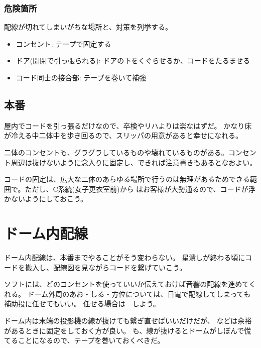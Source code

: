 \documentclass[letterpaper,10pt,dvipdfmx]{sphinxmanual}
\begin{document}
\subsubsection{危険箇所}
\label{\detokenize{haisen:id16}}
配線が切れてしまいがちな場所と、対策を列挙する。
\begin{itemize}
\item {} 
コンセント: テープで固定する

\item {} 
ドア(開閉で引っ張られる): ドアの下をくぐらせるか、コードをたるませる

\item {} 
コード同士の接合部: テープを巻いて補強

\end{itemize}


\subsection{本番}
\label{\detokenize{haisen:id17}}
屋内でコードを引っ張るだけなので、卒検やリハよりは楽なはずだ。
かなり床が冷える中二体中を歩き回るので、スリッパの用意があると幸せになれる。

二体のコンセントも、グラグラしているものや壊れているものがある。コンセント周辺は抜けないように念入りに固定し、できれば注意書きもあるとなおよい。

コードの固定は、広大な二体のあらゆる場所で行うのは無理があるためできる範囲で。ただし、C系統(女子更衣室前)から
はお客様が大勢通るので、コードが浮かないようにしておこう。


\section{ドーム内配線}
\label{\detokenize{haisen:id18}}
ドーム内配線は、本番までやることがそう変わらない。
星潰しが終わる頃にコードを搬入し、配線図を見ながらコードを繋げていこう。

ソフトには、どのコンセントを使っていいか伝えておけば音響の配線を進めてくれる。
ドーム外周のあお・しる・方位については、日電で配線してしまっても補助投に任せてもいい。
任せる場合は　しよう。

ドーム内は末端の投影機の線が抜けても繋ぎ直せばいいだけだが、
などは余裕があるときに固定をしておく方が良い。
も、線が抜けるとドームがしぼんで慌てることになるので、テープを巻いておくべきだ。
\end{document}
